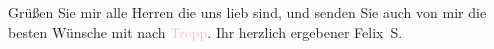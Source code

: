 \pstart
           Grüßen Sie mir alle Herren die uns lieb sind, und senden Sie auch von mir die besten
               Wünsche mit nach \textcolor{pink}{Tropp}{}\ledrightnote{\textcolor{pink}{Opava}}.\pend
           \pstart  Ihr herzlich ergebener \spacefill\mbox{Felix S.}\pend{}\endnumbering{}  
      